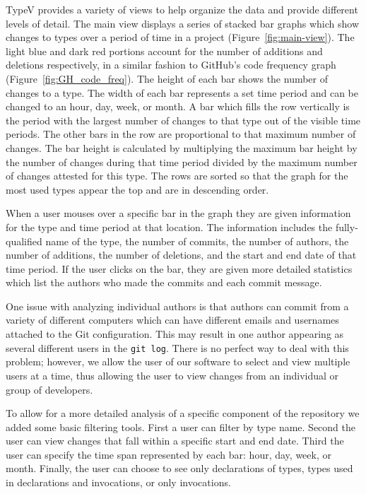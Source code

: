 TypeV provides a variety of views to help organize the data and provide different levels of detail. The main view displays a series of stacked bar graphs which show changes to types over a period of time in a project (Figure~\ref{fig:main-view}). The light blue  \additionsbox{10pt} and dark red \deletionsbox{10pt} portions account for the number of additions and deletions respectively, in a similar fashion to GitHub's code frequency graph (Figure~\ref{fig:GH_code_freq}). The height of each bar shows the number of changes to a type. The width of each bar represents a set time period and can be changed to an hour, day, week, or month. A bar which fills the row vertically is the period with the largest number of changes to that type out of the visible time periods. The other bars in the row are proportional to that maximum number of changes.  The bar height is calculated by multiplying the maximum bar height by the number of changes during that time period divided by the maximum number of changes attested for this type. The rows are sorted so that the graph for the most used types appear the top and are in descending order.

When a user mouses over a specific bar in the graph they are given information for the type and time period at that location. The information includes the fully-qualified name of the type, the number of commits, the number of authors, the number of additions, the number of deletions, and the start and end date of that time period. If the user clicks on the bar, they are given more detailed statistics which list the authors who made the commits and each commit message.

One issue with analyzing individual authors is that authors can commit from a variety of different computers which can have different emails and usernames attached to the Git configuration. This may result in one author appearing as several different users in the \texttt{git log}. There is no perfect way to deal with this problem; however, we allow the user of our software to select and view multiple users at a time, thus allowing the user to view changes from an individual or group of developers.

To allow for a more detailed analysis of a specific component of the repository we added some basic filtering tools. First a user can filter by type name. Second the user can view changes that fall within a specific start and end date. Third the user can specify the time span represented by each bar: hour, day, week, or month. Finally, the user can choose to see only declarations of types, types used in declarations and invocations, or only invocations.

